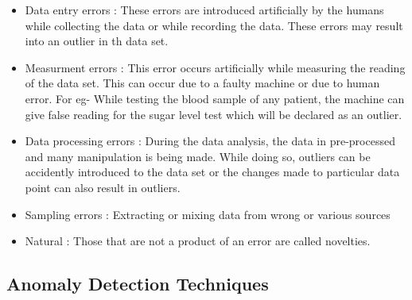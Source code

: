 \begin{itemize}
	\item Data entry errors : These errors are introduced artificially by the humans while
	collecting the data or while recording the data. These errors may result into an
	outlier in th data set.
	
	
	\item Measurment errors : This error occurs artificially while measuring the reading of
	the data set. This can occur due to a faulty machine or due to human error. For eg- While testing the blood sample of any patient, the machine can give false
	reading for the sugar level test which will be declared as an outlier.
	
	\item Data processing errors : During the data analysis, the data in pre-processed
	and many manipulation is being made. While doing so, outliers can be accidently
	introduced to the data set or the changes made to particular data point can also
	result in outliers.
	\item Sampling errors : Extracting or mixing data from wrong or various sources
	
	\item Natural : Those that are not a product of an error are called novelties.
	
\end{itemize} 



\subsection{Anomaly Detection Techniques} 

